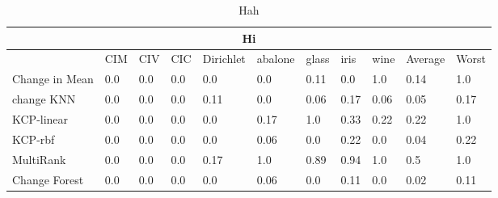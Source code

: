 
\begin{table}[!ht]
\centering
{
\begin{tabular}{ |p{2cm}|p{0.9cm}|p{0.9cm}|p{0.9cm}|p{0.9cm}|p{0.9cm}|p{0.9cm}|p{0.9cm}|p{0.9cm}|p{0.9cm}|p{0.9cm}|}
\hline
\multicolumn{11}{|c|}{Hi} \\
\hline

\hline
 & CIM & CIV & CIC & Dirichlet & abalone & glass & iris & wine & Average & Worst  \\
\hline
\hline
Change in Mean & 0.0 & 0.0 & 0.0 & 0.0 & 0.0 & 0.11 & 0.0 & 1.0& 0.14 & 1.0 \\
change KNN & 0.0 & 0.0 & 0.0 & 0.11 & 0.0 & 0.06 & 0.17 & 0.06& 0.05 & 0.17 \\
KCP-linear & 0.0 & 0.0 & 0.0 & 0.0 & 0.17 & 1.0 & 0.33 & 0.22& 0.22 & 1.0 \\
KCP-rbf & 0.0 & 0.0 & 0.0 & 0.0 & 0.06 & 0.0 & 0.22 & 0.0& 0.04 & 0.22 \\
MultiRank & 0.0 & 0.0 & 0.0 & 0.17 & 1.0 & 0.89 & 0.94 & 1.0& 0.5 & 1.0 \\
Change Forest & 0.0 & 0.0 & 0.0 & 0.0 & 0.06 & 0.0 & 0.11 & 0.0& 0.02 & 0.11 \\
\hline
\end{tabular}}
\\
\caption{Hah}
\vspace{10pt}
\label{tab:yourlabel}
\end{table}